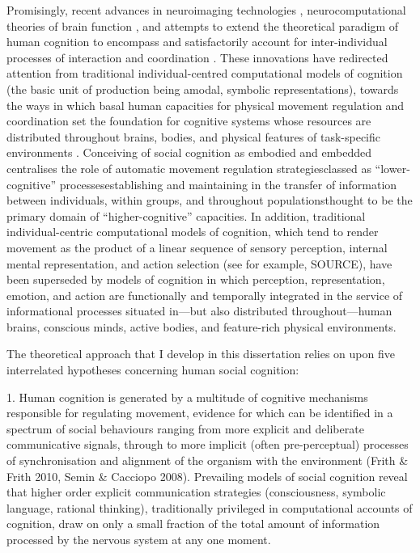 \documentclass[12pt]{report}
\begin{document}
Promisingly, recent advances in neuroimaging technologies \citep{Frith2007}, neurocomputational theories of brain function \citep{Friston2010,Frith2010,Clark2013}, and attempts to extend the theoretical paradigm of human cognition to encompass and satisfactorily account for inter-individual processes of interaction and coordination \citep{Sebanz2006,Marsh2009a,Dale2014}. These innovations have redirected attention from traditional individual-centred computational models of cognition (the basic unit of production being amodal, symbolic representations), towards the ways in which basal human capacities for physical movement regulation and coordination set the foundation for cognitive systems whose resources are distributed throughout brains, bodies, and physical features of task-specific environments \citep{Hutchins2000,Kirsh2006,Semin2008,Semin2012,Coey2012}. Conceiving of social cognition as embodied and embedded centralises the role of automatic movement regulation strategies\nobreakdashtraditionally classed as ``lower-cognitive'' processes\nobreakdashin establishing and maintaining in the transfer of information between individuals, within groups, and throughout populations\nobreakdashtraditionally thought to be the primary domain of ``higher-cognitive'' capacities.  In addition, traditional individual-centric computational models of cognition, which tend to render movement as the product of a linear sequence of sensory perception, internal mental representation, and action selection (see for example, SOURCE), have been superseded by models of cognition in which perception, representation, emotion, and action are functionally and temporally integrated in the service of informational processes situated in—but also distributed throughout—human brains, conscious minds, active bodies, and feature-rich physical environments.

The theoretical approach that I develop in this dissertation relies on upon five interrelated hypotheses concerning human social cognition:

1. Human cognition is generated by a multitude of cognitive mechanisms responsible for regulating movement, evidence for which can be identified in a spectrum of social behaviours ranging from more explicit and deliberate communicative signals, through to more implicit (often pre-perceptual) processes of synchronisation and alignment of the organism with the environment (Frith & Frith 2010, Semin & Cacciopo 2008). Prevailing models of social cognition reveal that higher order explicit communication strategies (consciousness, symbolic language, rational thinking), traditionally privileged in computational accounts of cognition, draw on only a small fraction of the total amount of information processed by the nervous system at any one moment.
\end{document}
